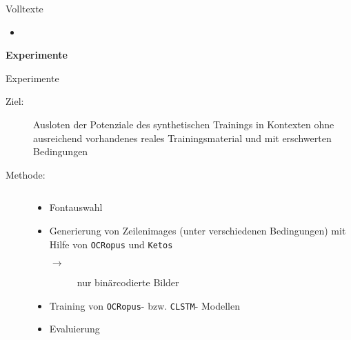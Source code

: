 \documentclass{bbawslides}
\begin{document}
\begin{bbawslide}{Volltexte}
  \vspace*{7mm}%
  \centerslidestrue%
  \begin{itemize}
    \item
  \end{itemize}
\end{bbawslide}

\begin{bbawpart}{\Large\bf Experimente}
\end{bbawpart}

\begin{bbawslide}{Experimente}
  \vspace*{7mm}%
  \centerslidestrue%
  \begin{description}
    \item[Ziel:] Ausloten der Potenziale des synthetischen Trainings in Kontexten ohne ausreichend vorhandenes reales Trainingsmaterial und mit erschwerten Bedingungen
    \item[Methode:] $~$
      \begin{itemize}
        \item Fontauswahl
        \item Generierung von Zeilenimages (unter verschiedenen Bedingungen) mit Hilfe von \texttt{OCRopus} und \texttt{Ketos}
        \begin{description}
          \item[$\rightarrow$] nur binärcodierte Bilder
        \end{description}
        \item Training von \texttt{OCRopus}- bzw. \texttt{CLSTM}- Modellen
        \item Evaluierung
      \end{itemize}
  \end{description}
\end{bbawslide}
\end{document}
